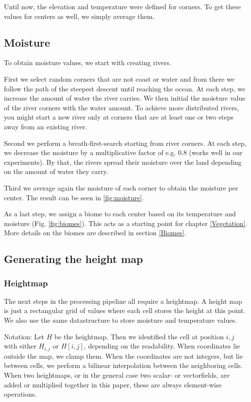 \documentclass[journal, letterpaper]{IEEEtran}
\begin{document}
Until now, the elevation and temperature were defined for corners. To get these values for centers as well, we simply average them.

\subsection{Moisture}\label{PolygonalMoisture}
To obtain moisture values, we start with creating rivers.

First we select random corners that are not coast or water and from there we follow the path of the steepest descent until reaching the ocean. At each step, we increase the amount of water the river carries. We then initial the moisture value of the river corners with the water amount. To achieve more distributed rivers, you might start a new river only at corners that are at least one or two steps away from an existing river.

Second we perform a breath-first-search starting from river corners. At each step, we decrease the moisture by a multiplicative factor of e.g. 0.8 (works well in our experiments). By that, the rivers spread their moisture over the land depending on the amount of water they carry.

Third we average again the moisture of each corner to obtain the moisture per center.
The result can be seen in \ref{fig:moisture}.

As a last step, we assign a biome to each center based on its temperature and moisture (Fig. \ref{fig:biomes}). This acts as a starting point for chapter \ref{Vegetation}. More details on the biomes are described in section \ref{Biomes}.

\subsection{Generating the height map}
\subsubsection{Heightmap}
The next steps in the processing pipeline all require a heightmap. A height map is just a rectangular grid of values where each cell stores the height at this point. We also use the same datastructure to store moisture and temperature values.

Notation: Let $H$ be the heightmap. Then we identified the cell at position $i,j$ with either $H_{i,j}$ or $H[i,j]$, depending on the readability. When coordinates lie outside the map, we clamp them. When the coordinates are not integers, but lie between cells, we perform a bilinear interpolation between the neighboring cells. When two heightmaps, or in the general case two scalar- or vectorfields, are added or multiplied together in this paper, these are always element-wise operations.
\end{document}
